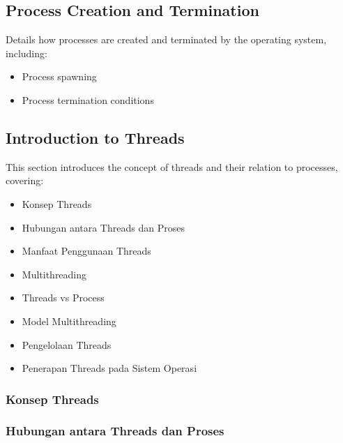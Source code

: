 \documentclass[12pt]{article}
\begin{document}
\subsection{Process Creation and Termination}
Details how processes are created and terminated by the operating system, including:
\begin{itemize}
    \item Process spawning
    \item Process termination conditions
\end{itemize}

\subsection{Introduction to Threads}
This section introduces the concept of threads and their relation to processes, covering:
\begin{itemize}
    \item Konsep Threads
    \item Hubungan antara Threads dan Proses
    \item Manfaat Penggunaan Threads
    \item Multithreading
    \item Threads vs Process
    \item Model Multithreading
    \item Pengelolaan Threads
    \item Penerapan Threads pada Sistem Operasi
\end{itemize}
\subsubsection{Konsep Threads}
\subsubsection{Hubungan antara Threads dan Proses}
\end{document}
